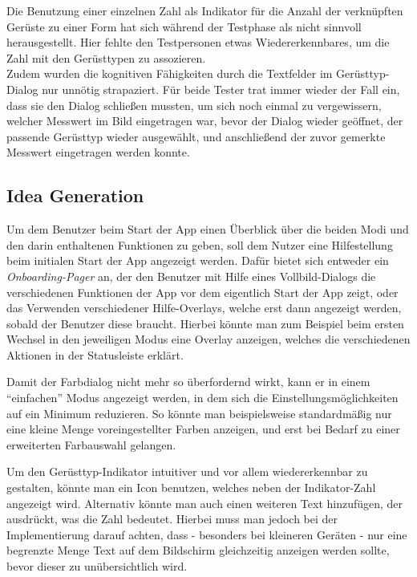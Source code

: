 Die Benutzung einer einzelnen Zahl als Indikator für die Anzahl der verknüpften Gerüste zu einer Form hat sich während der Testphase als nicht sinnvoll herausgestellt.
Hier fehlte den Testpersonen etwas Wiedererkennbares, um die Zahl mit den Gerüsttypen zu assozieren.  \\

Zudem wurden die kognitiven Fähigkeiten durch die Textfelder im Gerüsttyp-Dialog nur unnötig strapaziert.
Für beide Tester trat immer wieder der Fall ein, dass sie den Dialog schließen mussten, um sich noch einmal zu vergewissern, welcher Messwert im Bild eingetragen war, bevor der Dialog wieder geöffnet, der passende Gerüsttyp wieder ausgewählt, und anschließend der zuvor gemerkte Messwert eingetragen werden konnte. \\


\subsection{Idea Generation}\label{subsec:idea3}
Um dem Benutzer beim Start der App einen Überblick über die beiden Modi und den darin enthaltenen Funktionen zu geben, soll dem Nutzer eine Hilfestellung beim initialen Start der App angezeigt werden.
Dafür bietet sich entweder ein \emph{Onboarding-Pager} an, der den Benutzer mit Hilfe eines Vollbild-Dialogs die verschiedenen Funktionen der App vor dem eigentlich Start der App zeigt, oder das Verwenden verschiedener Hilfe-Overlays, welche erst dann angezeigt werden, sobald der Benutzer diese braucht.
Hierbei könnte man zum Beispiel beim ersten Wechsel in den jeweiligen Modus eine Overlay anzeigen, welches die verschiedenen Aktionen in der Statusleiste erklärt. \\

Damit der Farbdialog nicht mehr so überfordernd wirkt, kann er in einem ``einfachen'' Modus angezeigt werden, in dem sich die Einstellungsmöglichkeiten auf ein Minimum reduzieren.
So könnte man beispielsweise standardmäßig nur eine kleine Menge voreingestellter Farben anzeigen, und erst bei Bedarf zu einer erweiterten Farbauswahl gelangen. \\

Um den Gerüsttyp-Indikator intuitiver und vor allem wiedererkennbar zu gestalten, könnte man ein Icon benutzen, welches neben der Indikator-Zahl angezeigt wird.
Alternativ könnte man auch einen weiteren Text hinzufügen, der ausdrückt, was die Zahl bedeutet.
Hierbei muss man jedoch bei der Implementierung darauf achten, dass - besonders bei kleineren Geräten - nur eine begrenzte Menge Text auf dem Bildschirm gleichzeitig anzeigen werden sollte, bevor dieser zu unübersichtlich wird. \\

